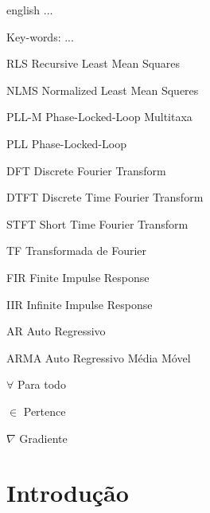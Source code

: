 \documentclass[
12pt,
openany, %
oneside, %
a4paper,			
english,			
brazil			        %
]{abntbibufjf}
\begin{document}
\begin{resumo}[ABSTRACT]
	\begin{otherlanguage*}{english}
		...
		
		Key-words: ...
	\end{otherlanguage*}
\end{resumo}


\listoffigures*
\cleardoublepage


\listoftables*
\cleardoublepage

\begin{siglas} %
	\item[RLS] Recursive Least Mean Squares
	\item[NLMS] Normalized Least Mean Squeres
	\item[PLL-M] Phase-Locked-Loop Multitaxa
	\item[PLL] Phase-Locked-Loop 
	\item[DFT] Discrete Fourier Transform
	\item[DTFT] Discrete Time Fourier Transform
	\item[STFT] Short Time Fourier Transform
	\item[TF] Transformada de Fourier
	\item[FIR] Finite Impulse Response
	\item[IIR] Infinite Impulse Response
	\item[AR]  Auto Regressivo
	\item[ARMA] Auto Regressivo Média Móvel 
	
\end{siglas}

\begin{simbolos} %
	\item[$ \forall $] Para todo
	\item[$ \in $] Pertence
	\item[$ \nabla $] Gradiente
	
\end{simbolos}

\chapter{Introdução}

\end{document}
